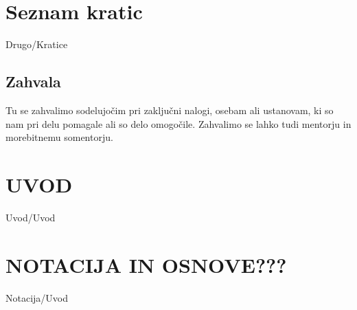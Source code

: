 \documentclass[12pt,a4paper,titlepage,openany,twoside]{report}
\begin{document}
\newpage

\tableofcontents
{}
\newpage
\listoftables
{}
\newpage
\listoffigures
{}
\newpage

\chapter*{Seznam kratic}
\thispagestyle{fancyplain}
{Drugo/Kratice}
\newpage

\normalsize



\newpage
\section*{\textbf{Zahvala}}


Tu se zahvalimo sodelujočim pri zaključni nalogi, osebam ali ustanovam, ki so nam pri delu pomagale ali so delo omogočile. Zahvalimo se lahko tudi mentorju in morebitnemu somentorju.


% 
% 

\chapter{UVOD}\label{sec:uvod}
\thispagestyle{fancy} %

{Uvod/Uvod}

\chapter{NOTACIJA IN OSNOVE???}\label{sec:Notacija}
\thispagestyle{fancy} 
{Notacija/Uvod}
\end{document}
